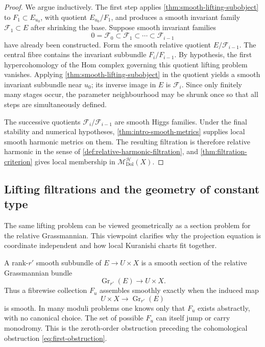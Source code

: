 \documentclass[11pt,reqno]{amsart}
\theoremstyle{definition}
\theoremstyle{remark}
\newcommand{\cH}{\mathcal H}
\newcommand{\Dol}{\mathrm{Dol}}
\newcommand{\MHDol}{\mathscr M^{\cH}_{\Dol}}
\begin{document}
\begin{proof}
We argue inductively.  The first step applies \cref{thm:smooth-lifting-subobject} to $F_1\subset E_{u_0}$, with quotient $E_{u_0}/F_1$, and produces a smooth invariant family $\mathcal F_1\subset E$ after shrinking the base.  Suppose smooth invariant families
\[
  0=\mathcal F_0\subset\mathcal F_1\subset\cdots\subset\mathcal F_{i-1}
\]
have already been constructed.  Form the smooth relative quotient $E/\mathcal F_{i-1}$.  The central fibre contains the invariant subbundle $F_i/F_{i-1}$.  By hypothesis, the first hypercohomology of the Hom complex governing this quotient lifting problem vanishes.  Applying \cref{thm:smooth-lifting-subobject} in the quotient yields a smooth invariant subbundle near $u_0$; its inverse image in $E$ is $\mathcal F_i$.  Since only finitely many stages occur, the parameter neighbourhood may be shrunk once so that all steps are simultaneously defined.

The successive quotients $\mathcal F_i/\mathcal F_{i-1}$ are smooth Higgs families.  Under the final stability and numerical hypotheses, \cref{thm:intro-smooth-metrics} supplies local smooth harmonic metrics on them.  The resulting filtration is therefore relative harmonic in the sense of \cref{def:relative-harmonic-filtration}, and \cref{thm:filtration-criterion} gives local membership in $\MHDol(X)$.
\end{proof}


\subsection{Lifting filtrations and the geometry of constant type}

The same lifting problem can be viewed geometrically as a section problem for the relative Grassmannian.  This viewpoint clarifies why the projection equation is coordinate independent and how local Kuranishi charts fit together.


A rank-$r'$ smooth subbundle of $E\to U\times X$ is a smooth section of the relative Grassmannian bundle
\[
  \operatorname{Gr}_{r'}(E)\to U\times X.
\]
Thus a fibrewise collection $F_u$ assembles smoothly exactly when the induced map
\[
  U\times X\to\operatorname{Gr}_{r'}(E)
\]
is smooth.  In many moduli problems one knows only that $F_u$ exists abstractly, with no canonical choice.  The set of possible $F_u$ can itself jump or carry monodromy.  This is the zeroth-order obstruction preceding the cohomological obstruction \eqref{eq:first-obstruction}.
\end{document}
